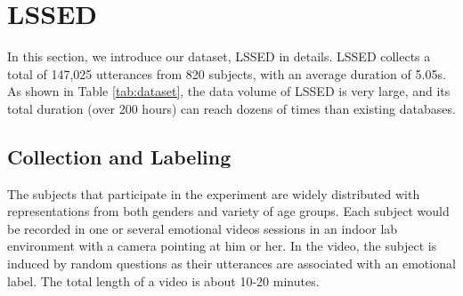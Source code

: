 \documentclass{article}
\begin{document}
\section{LSSED}
\label{sec:format}
In this section, we introduce our dataset, LSSED in details. 
LSSED collects a total of 147,025 utterances from 820 subjects, with an average duration of 5.05s.
As shown in Table \ref{tab:dataset}, the data volume of LSSED is very large, and its total duration (over 200 hours) can reach dozens of times than existing databases.

\begin{table*}[htbp]
  \caption{Comparison to existing public speech emotion datasets.}
  \label{tab:dataset}
\end{table*}

\subsection{Collection and Labeling}
The subjects that participate in the experiment are widely distributed with representations from both genders and variety of age groups.
Each subject would be recorded in one or several emotional videos sessions in an indoor lab environment with a camera pointing at him or her. 
In the video, the subject is induced by random questions as their utterances are associated with an emotional label.
The total length of a video is about 10-20 minutes. 
\end{document}
